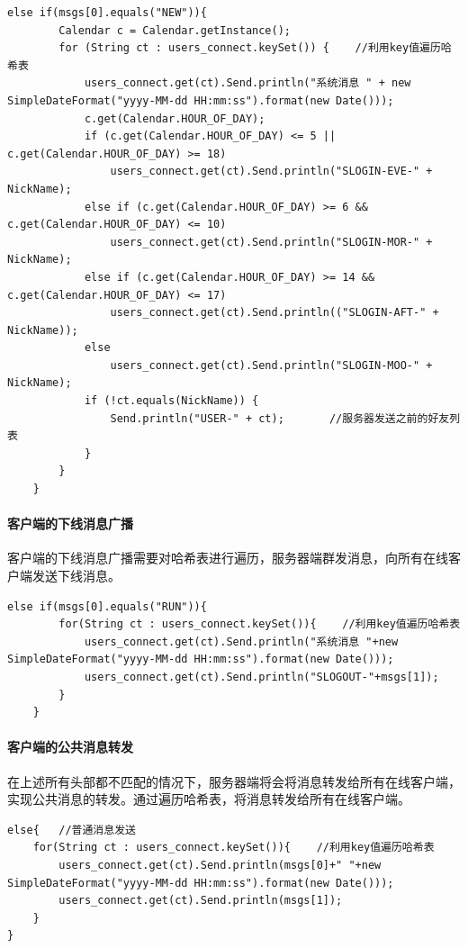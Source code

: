 \documentclass[UTF8,12pt]{article}
\begin{document}
\begin{lstlisting}[title=客户端的上线消息广播,frame=shadowbox]
    else if(msgs[0].equals("NEW")){
        Calendar c = Calendar.getInstance();
        for (String ct : users_connect.keySet()) {    //利用key值遍历哈希表
            users_connect.get(ct).Send.println("系统消息 " + new SimpleDateFormat("yyyy-MM-dd HH:mm:ss").format(new Date()));
            c.get(Calendar.HOUR_OF_DAY);
            if (c.get(Calendar.HOUR_OF_DAY) <= 5 || c.get(Calendar.HOUR_OF_DAY) >= 18)
                users_connect.get(ct).Send.println("SLOGIN-EVE-" + NickName);
            else if (c.get(Calendar.HOUR_OF_DAY) >= 6 && c.get(Calendar.HOUR_OF_DAY) <= 10)
                users_connect.get(ct).Send.println("SLOGIN-MOR-" + NickName);
            else if (c.get(Calendar.HOUR_OF_DAY) >= 14 && c.get(Calendar.HOUR_OF_DAY) <= 17)
                users_connect.get(ct).Send.println(("SLOGIN-AFT-" + NickName));
            else
                users_connect.get(ct).Send.println("SLOGIN-MOO-" + NickName);
            if (!ct.equals(NickName)) {
                Send.println("USER-" + ct);       //服务器发送之前的好友列表
            }
        }
    }
\end{lstlisting}

\paragraph{客户端的下线消息广播}
客户端的下线消息广播需要对哈希表进行遍历，服务器端群发消息，向所有在线客户端发送下线消息。

\begin{lstlisting}[title=客户端的下线消息广播,frame=shadowbox]
    else if(msgs[0].equals("RUN")){
        for(String ct : users_connect.keySet()){    //利用key值遍历哈希表
            users_connect.get(ct).Send.println("系统消息 "+new SimpleDateFormat("yyyy-MM-dd HH:mm:ss").format(new Date()));
            users_connect.get(ct).Send.println("SLOGOUT-"+msgs[1]);
        }
    }
\end{lstlisting}

\paragraph{客户端的公共消息转发}
在上述所有头部都不匹配的情况下，服务器端将会将消息转发给所有在线客户端，实现公共消息的转发。通过遍历哈希表，将消息转发给所有在线客户端。

\begin{lstlisting}[title=客户端的公共消息转发,frame=shadowbox]
    else{   //普通消息发送
    for(String ct : users_connect.keySet()){    //利用key值遍历哈希表
        users_connect.get(ct).Send.println(msgs[0]+" "+new SimpleDateFormat("yyyy-MM-dd HH:mm:ss").format(new Date()));
        users_connect.get(ct).Send.println(msgs[1]);
    }
}
\end{lstlisting}
\end{document}
